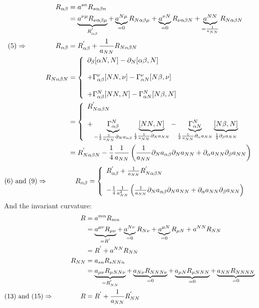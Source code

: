 \begin{align}
R_{\alpha\beta} &= a^{sn} R_{s\alpha\beta n}\\
 &= \underbrace{a^{\nu\mu} R_{\nu\alpha\beta \mu}}_{R^{'}_{\alpha\beta}} + \underbrace{a^{N \mu}}_{=0} R_{N \alpha\beta \mu}+\underbrace{a^{\nu N}}_{=0} R_{\nu\alpha\beta N}+\underbrace{a^{NN}}_{=\frac{1}{a_{NN}}} R_{N \alpha\beta N}\\
\text{(5)}\Rightarrow \quad\quad\quad\quad R_{\alpha\beta} &=R^{'}_{\alpha\beta} + \frac{1}{a_{NN}} R_{N\alpha\beta N}\\
R_{N \alpha\beta N}&=\left\{\begin{array}{l}\partial_{\beta}[\alpha N,N]-\partial_{N}[\alpha\beta,N]\\\\ + \Gamma^{\nu}_{\alpha\beta}[NN,\nu] -\Gamma^{\nu}_{\alpha N}[N \beta,\nu]\\\\
+ \Gamma^{N}_{\alpha\beta}[NN,N] -\Gamma^{N}_{\alpha N}[N \beta,N]
\end{array}\right.\\
&=\left\{\begin{array}{l}R^{'}_{N \alpha\beta N}\\\\
+ \underbrace{\Gamma^{N}_{\alpha\beta}}_{-\frac{1}{2}\frac{1}{a_{NN}}\partial_N a_{\alpha\beta}}\underbrace{[NN,N]}_{\frac{1}{2}\frac{1}{a_{NN}}\partial_N a_{NN}} -\underbrace{\Gamma^{N}_{\alpha N}}_{\frac{1}{2}\frac{1}{a_{NN}}\partial_{\alpha} a_{NN}}\underbrace{[N \beta,N]}_{\frac{1}{2}\partial_{\beta} a_{NN}}\end{array}\right.\\
&=R^{'}_{N \alpha\beta N}
 -\frac{1}{4}\frac{1}{a_{NN}}\left( \frac{1}{a_{NN}}\partial_N a_{\alpha\beta}\partial_N a_{NN}+\partial_{\alpha} a_{NN}\partial_{\beta} a_{NN}\right)
\end{align}
\begin{align}
 \text{(6) and (9)}\Rightarrow \quad\quad\quad\quad R_{\alpha\beta} &=\left\{\begin{array}{l}R^{'}_{\alpha\beta} + \frac{1}{a_{NN}}R^{'}_{N \alpha\beta N} \\\\ -\frac{1}{4}\frac{1}{a_{NN}^2}\left( \frac{1}{a_{NN}}\partial_N a_{\alpha\beta}\partial_N a_{NN}+\partial_{\alpha} a_{NN}\partial_{\beta} a_{NN}\right)\end{array}\right.
\end{align}
And the invariant curvature:
\begin{align}
R &= a^{mn} R_{mn}\\
&= \underbrace{a^{\mu\nu} R_{\mu\nu}}_{= R^{'}}+\underbrace{a^{N\nu}}_{=0} R_{N\nu}+\underbrace{a^{\mu N}}_{=0} R_{\mu N}+a^{NN} R_{NN}\\
&= R^{'}+a^{NN} R_{NN}\\
R_{NN}&= a_{sn}R_{sNNn}\\
&= \underbrace{a_{\mu\nu}R_{\mu N N\nu}}_{=R^{'}_{NN}}+\underbrace{a_{N\nu}R_{N N N\nu}}_{=0}+\underbrace{a_{\mu N}R_{\mu N NN}}_{=0}+\underbrace{a_{NN}R_{N N NN}}_{=0}\\
\text{(13) and (15)}\Rightarrow \quad\quad\quad\quad R &= R^{'}+\frac{1}{a_{NN}} R^{'}_{NN}
\end{align}
